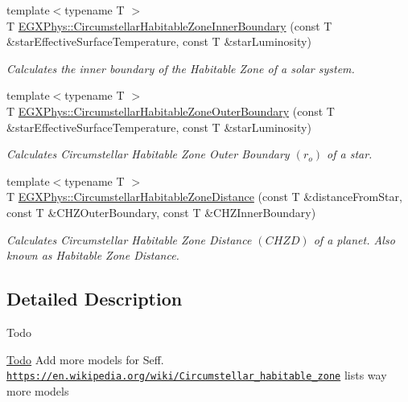 \begin{DoxyCompactItemize}
{\footnotesize template$<$typename T $>$ }\\T \mbox{\hyperlink{group___e_g_x_phys-_circumstellar_habitable_zone_limit_ga9ee2e8023cb444aa4638c962788b5853}{E\+G\+X\+Phys\+::\+Circumstellar\+Habitable\+Zone\+Inner\+Boundary}} (const T \&star\+Effective\+Surface\+Temperature, const T \&star\+Luminosity)
\begin{DoxyCompactList}\small\item\em Calculates the inner boundary of the Habitable Zone of a solar system. \end{DoxyCompactList}\item 
{\footnotesize template$<$typename T $>$ }\\T \mbox{\hyperlink{group___e_g_x_phys-_circumstellar_habitable_zone_limit_gaa47fcde814ba8007de800e930fc0a08d}{E\+G\+X\+Phys\+::\+Circumstellar\+Habitable\+Zone\+Outer\+Boundary}} (const T \&star\+Effective\+Surface\+Temperature, const T \&star\+Luminosity)
\begin{DoxyCompactList}\small\item\em Calculates Circumstellar Habitable Zone Outer Boundary $(r_o)$ of a star. \end{DoxyCompactList}\item 
{\footnotesize template$<$typename T $>$ }\\T \mbox{\hyperlink{group___e_g_x_phys-_circumstellar_habitable_zone_limit_gacf3a720793cdb27f6d93b170b44e81be}{E\+G\+X\+Phys\+::\+Circumstellar\+Habitable\+Zone\+Distance}} (const T \&distance\+From\+Star, const T \&C\+H\+Z\+Outer\+Boundary, const T \&C\+H\+Z\+Inner\+Boundary)
\begin{DoxyCompactList}\small\item\em Calculates Circumstellar Habitable Zone Distance $(CHZD)$ of a planet. Also known as Habitable Zone Distance. \end{DoxyCompactList}\end{DoxyCompactItemize}


\subsection{Detailed Description}
\begin{DoxyRefDesc}{Todo}
\item[\mbox{\hyperlink{todo__todo000001}{Todo}}]Add more models for Seff. \href{https://en.wikipedia.org/wiki/Circumstellar_habitable_zone}{\tt https\+://en.\+wikipedia.\+org/wiki/\+Circumstellar\+\_\+habitable\+\_\+zone} lists way more models \end{DoxyRefDesc}


